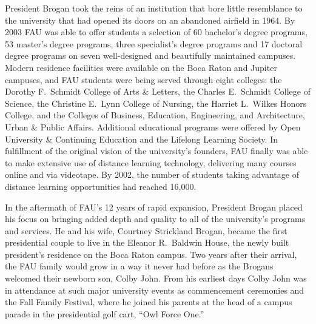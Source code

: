\documentclass{article}
\begin{document}
President Brogan took the reins of an institution that bore little resemblance to the university that had opened its doors on an abandoned airfield in 1964.  By 2003 FAU was able to offer students a selection of 60 bachelor's degree programs, 53 master's degree programs, three specialist's degree programs and 17 doctoral degree programs on seven well-designed and beautifully maintained campuses.  Modern residence facilities were available on the Boca Raton and Jupiter campuses, and FAU students were being served through eight colleges: the Dorothy F.\ Schmidt College of Arts \& Letters, the Charles E.\ Schmidt College of Science, the Christine E.\ Lynn College of Nursing, the Harriet L.\ Wilkes Honors College, and the Colleges of Business, Education, Engineering, and Architecture, Urban \& Public Affairs.  Additional educational programs were offered by Open University \& Continuing Education and the Lifelong Learning Society.  In fulfillment of the original vision of the university's founders, FAU finally was able to make extensive use of distance learning technology, delivering many courses online and via videotape.  By 2002, the number of students taking advantage of distance learning opportunities had reached 16,000.

In the aftermath of FAU's 12 years of rapid expansion, President Brogan placed his focus on bringing added depth and quality to all of the university's programs and services.  He and his wife, Courtney Strickland Brogan, became the first presidential couple to live in the Eleanor R.\ Baldwin House, the newly built president's residence on the Boca Raton campus.  Two years after their arrival, the FAU family would grow in a way it never had before as the Brogans welcomed their newborn son, Colby John.  From his earliest days Colby John was in attendance at such major university events as commencement ceremonies and the Fall Family Festival, where he joined his parents at the head of a campus parade in the presidential golf cart, ``Owl Force One.''
\end{document}
